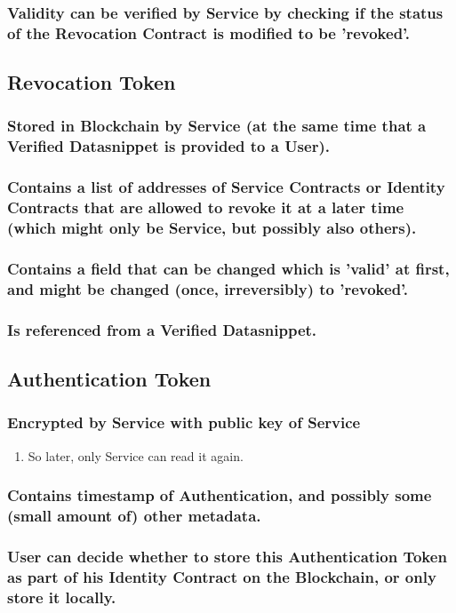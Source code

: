 \documentclass[11pt]{article}
\begin{document}
\subsubsection{Validity can be verified by Service by checking if the status of the Revocation Contract is modified to be 'revoked'.}
\label{sec:org16b3576}
\subsection{Revocation Token}
\label{sec:orgc39308b}
\subsubsection{Stored in Blockchain by Service (at the same time that a Verified Datasnippet is provided to a User).}
\label{sec:org5fdba12}
\subsubsection{Contains a list of addresses of Service Contracts or Identity Contracts that are allowed to revoke it at a later time (which might only be Service, but possibly also others).}
\label{sec:org2333475}
\subsubsection{Contains a field that can be changed which is 'valid' at first, and might be changed (once, irreversibly) to 'revoked'.}
\label{sec:org4c5f9d5}
\subsubsection{Is referenced from a Verified Datasnippet.}
\label{sec:org77964cf}
\subsection{Authentication Token}
\label{sec:org57f7cdd}
\subsubsection{Encrypted by Service with public key of Service}
\label{sec:org99fdbdd}
\begin{enumerate}
\item So later, only Service can read it again.
\label{sec:org33876c6}
\end{enumerate}
\subsubsection{Contains timestamp of Authentication, and possibly some (small amount of) other metadata.}
\label{sec:orgd2c2b3e}
\subsubsection{User can decide whether to store this Authentication Token as part of his Identity Contract on the Blockchain, or only store it locally.}
\label{sec:orgdc4ae92}
\end{document}
